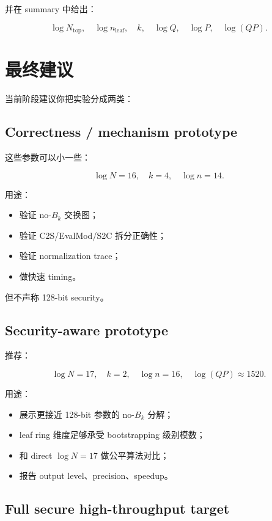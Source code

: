 \documentclass[UTF8,11pt,a4paper]{ctexart}
\begin{document}
并在 summary 中给出：

\[
\log N_{\text{top}},
\quad
\log n_{\text{leaf}},
\quad
k,
\quad
\log Q,
\quad
\log P,
\quad
\log(QP).
\]

\section{最终建议}

当前阶段建议你把实验分成两类：

\subsection{Correctness / mechanism prototype}

这些参数可以小一些：

\[
\log N=16,\quad k=4,\quad \log n=14.
\]

用途：
\begin{itemize}[leftmargin=2em]
    \item 验证 no-$B_k$ 交换图；
    \item 验证 C2S/EvalMod/S2C 拆分正确性；
    \item 验证 normalization trace；
    \item 做快速 timing。
\end{itemize}

但不声称 128-bit security。

\subsection{Security-aware prototype}

推荐：

\[
\boxed{
\log N=17,\quad k=2,\quad \log n=16,\quad \log(QP)\approx1520.
}
\]

用途：
\begin{itemize}[leftmargin=2em]
    \item 展示更接近 128-bit 参数的 no-$B_k$ 分解；
    \item leaf ring 维度足够承受 bootstrapping 级别模数；
    \item 和 direct $\log N=17$ 做公平算法对比；
    \item 报告 output level、precision、speedup。
\end{itemize}

\subsection{Full secure high-throughput target}
\end{document}

